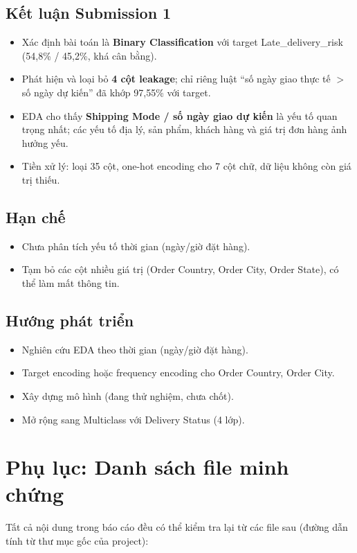 \documentclass[11pt,a4paper]{article}
\newcommand{\col}[1]{\textsf{#1}}
\begin{document}
\subsection*{Kết luận Submission 1}
\begin{itemize}
  \item Xác định bài toán là \textbf{Binary Classification} với target \col{Late\_delivery\_risk} (54,8\% / 45,2\%, khá cân bằng).
  \item Phát hiện và loại bỏ \textbf{4 cột leakage}; chỉ riêng luật ``số ngày giao thực tế $>$ số ngày dự kiến'' đã khớp 97,55\% với target.
  \item EDA cho thấy \textbf{Shipping Mode / số ngày giao dự kiến} là yếu tố quan trọng nhất; các yếu tố địa lý, sản phẩm, khách hàng và giá trị đơn hàng ảnh hưởng yếu.
  \item Tiền xử lý: loại 35 cột, one-hot encoding cho 7 cột chữ, dữ liệu không còn giá trị thiếu.
\end{itemize}

\subsection*{Hạn chế}
\begin{itemize}
  \item Chưa phân tích yếu tố thời gian (ngày/giờ đặt hàng).
  \item Tạm bỏ các cột nhiều giá trị (Order Country, Order City, Order State), có thể làm mất thông tin.
\end{itemize}

\subsection*{Hướng phát triển}
\begin{itemize}
  \item Nghiên cứu EDA theo thời gian (ngày/giờ đặt hàng).
  \item Target encoding hoặc frequency encoding cho Order Country, Order City.
  \item Xây dựng mô hình (đang thử nghiệm, chưa chốt).
  \item Mở rộng sang Multiclass với \col{Delivery Status} (4 lớp).
\end{itemize}

\newpage
\appendix
\section*{Phụ lục: Danh sách file minh chứng}
Tất cả nội dung trong báo cáo đều có thể kiểm tra lại từ các file sau (đường dẫn tính từ thư mục gốc của project):
\end{document}
